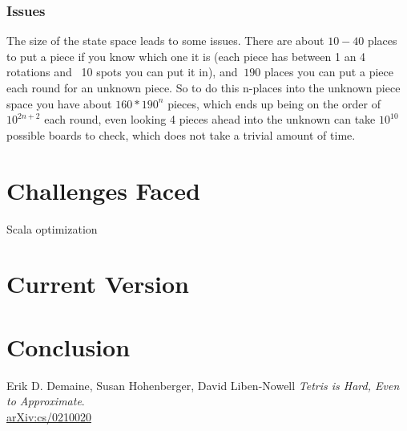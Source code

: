 \documentclass[ fontsize=11pt]{article}
\begin{document}
\subsubsection{Issues}
\par The size of the state space leads to some issues. There are about $10-40$ places to put a piece if you know which one it is (each piece has between 1 an 4 rotations and ~10 spots you can put it in), and $~190$ places you can put a piece each round for an unknown piece. So to do this n-places into the unknown piece space you have about $160*190^n$ pieces, which ends up being on the order of $10^{2n + 2}$ each round, even looking 4 pieces ahead into the unknown can take $10^{10}$ possible boards to check, which does not take a trivial amount of time.

\section{Challenges Faced}
\label{sec:challenges_faced}

\par Scala optimization


\section{Current Version}
\label{sec:current_version}



\section{Conclusion}
\label{sec:conclusion}

\newpage


\begin{thebibliography}{9}
Erik D. Demaine, Susan Hohenberger, David Liben-Nowell
\textit{
Tetris is Hard, Even to Approximate}.
\\\href{https://arxiv.org/abs/cs/0210020}{arXiv:cs/0210020}

\end{thebibliography}

% 
\end{document}
